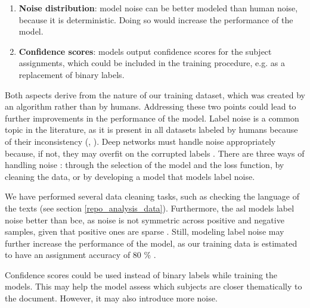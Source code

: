 \begin{enumerate}
    \item \textbf{Noise distribution}: model noise can be better modeled than human noise, because it is deterministic. Doing so would increase the performance of the model.
    \item \textbf{Confidence scores}: models output confidence scores for the subject assignments, which could be included in the training procedure, e.g. as a replacement of binary labels.
\end{enumerate}

Both aspects derive from the nature of our training dataset, which was created by an algorithm rather than by humans. Addressing these two points could lead to further improvements in the performance of the model. Label noise is a common topic in the literature, as it is present in all datasets labeled by humans because of their inconsistency (\cite{morris2010individual}, \cite{medelyan2008domain}). Deep networks must handle noise appropriately because, if not, they may overfit on the corrupted labels \cite{chen2019understanding}. There are three ways of handling noise \cite{karimi2020deep}: through the selection of the model and the loss function, by cleaning the data, or by developing a model that models label noise.

We have performed several data cleaning tasks, such as checking the language of the texts (see section \ref{repo_analysis_data}). Furthermore, the \acrlong{asl} models label noise better than \acrlong{bce}, as noise is not symmetric across positive and negative samples, given that positive ones are sparse \cite{zhao2021evaluating}. Still, modeling label noise may further increase the performance of the model, as our training data is estimated to have an assignment accuracy of 80 \% \cite{shen2018web}.

Confidence scores could be used instead of binary labels while training the models. This may help the model assess which subjects are closer thematically to the document. However, it may also introduce more noise.